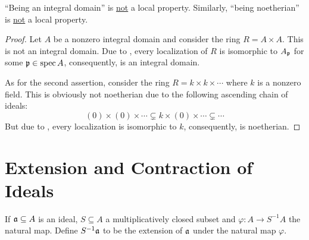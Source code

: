 \begin{proposition}
    ``Being an integral domain'' is \underline{not} a local property. Similarly, ``being noetherian'' is \underline{not} a local property.
\end{proposition}
\begin{proof}
    Let $A$ be a nonzero integral domain and consider the ring $R = A\times A$. This is not an integral domain. Due to , every localization of $R$ is isomorphic to $A_{\mathfrak p}$ for some $\mathfrak p\in\operatorname{spec} A$, consequently, is an integral domain. 

    As for the second assertion, consider the ring $R = k\times k\times\cdots$ where $k$ is a nonzero field. This is obviously not noetherian due to the following ascending chain of ideals: 
    \begin{equation*}
        (0)\times(0)\times\cdots\subsetneq k\times(0)\times\cdots\subsetneq\cdots
    \end{equation*}
    But due to , every localization is isomorphic to $k$, consequently, is noetherian.
\end{proof}

\section{Extension and Contraction of Ideals}

\begin{definition}
    If $\mathfrak a\subseteq A$ is an ideal, $S\subseteq A$ a multiplicatively closed subset and $\varphi: A\to S^{-1}A$ the natural map. Define $S^{-1}\mathfrak a$ to be the extension of $\mathfrak a$ under the natural map $\varphi$.
\end{definition}

